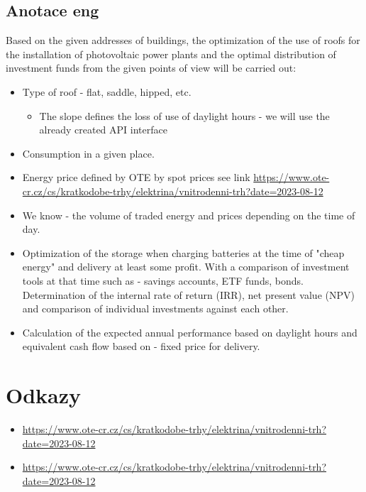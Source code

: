 \documentclass[a4paper, 12pt]{article}
\begin{document}
\subsection*{Anotace eng}
Based on the given addresses of buildings, the optimization of the use of roofs for the installation of photovoltaic power plants and the optimal distribution of investment funds from the given points of view will be carried out:
\begin{itemize}

    \item Type of roof - flat, saddle, hipped, etc.
    \begin{itemize}
        \item The slope defines the loss of use of daylight hours - we will use the already created API interface
    \end{itemize}
    \item Consumption in a given place.
    \item Energy price defined by OTE by spot prices see link \url{https://www.ote-cr.cz/cs/kratkodobe-trhy/elektrina/vnitrodenni-trh?date=2023-08-12}
    \item We know - the volume of traded energy and prices depending on the time of day.
    \item Optimization of the storage when charging batteries at the time of "cheap energy" and delivery at least some profit. With a comparison of investment tools at that time such as - savings accounts, ETF funds, bonds. Determination of the internal rate of return (IRR), net present value (NPV) and comparison of individual investments against each other.
    \item Calculation of the expected annual performance based on daylight hours and equivalent cash flow based on - fixed price for delivery.

\end{itemize}

\section*{Odkazy}

\begin{itemize}
    \item \url{https://www.ote-cr.cz/cs/kratkodobe-trhy/elektrina/vnitrodenni-trh?date=2023-08-12}
    \item \url{https://www.ote-cr.cz/cs/kratkodobe-trhy/elektrina/vnitrodenni-trh?date=2023-08-12}
\end{itemize}
\end{document}
